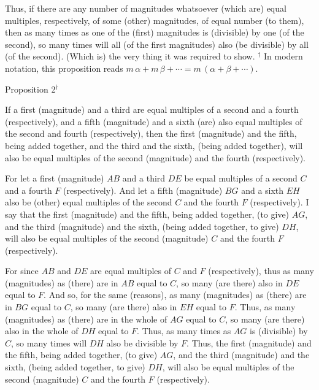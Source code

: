 Thus, if there are any number of magnitudes whatsoever (which are) equal multiples, respectively, of
some (other) magnitudes,  of  equal  number (to them), then as many times as one of the (first) magnitudes is (divisible) by one (of the second), so many times
will all (of the first magnitudes) also (be divisible) by all (of the second). (Which is)
the very thing it was required to show.
{\footnotesize \noindent$^\dag$ In modern notation, this proposition
reads $m\,\alpha + m\,\beta +\cdots= m\,(\alpha+\beta+\cdots)$.}


\begin{center}
{\large Proposition 2}$^{\dag}$
\end{center}

If a first (magnitude) and a third are equal multiples of a second
and a fourth (respectively), and a fifth (magnitude) and a sixth (are) also equal multiples of the
second and fourth (respectively), then the first (magnitude) and the fifth, being added together, and the third and the sixth,  (being added together), will also be equal multiples of the
second (magnitude) and the fourth (respectively).

For let a first (magnitude) $AB$ and a third $DE$ be equal multiples of a
second $C$ and a fourth $F$ (respectively). And let a fifth (magnitude) $BG$
and a sixth $EH$ also be (other) equal multiples of the second $C$ and the fourth $F$
(respectively). I say that the first (magnitude) and the fifth, being added together, (to give) $AG$,
and the third (magnitude) and the sixth, (being added together, to give) $DH$, will also be
equal multiples of the second (magnitude) $C$ and the fourth $F$ (respectively).

\epsfysize=1.5in
\centerline{}

For since $AB$ and $DE$ are equal multiples of $C$ and $F$ (respectively), 
thus as many (magnitudes) as (there) are in $AB$ equal to $C$, so many (are there) also
in $DE$ equal to $F$.  And so, for the same (reasons),   as many (magnitudes) as (there) are in $BG$ equal to $C$, so many (are there) also in $EH$ equal to $F$.
Thus, as many (magnitudes) as (there) are in the whole of $AG$ equal to $C$,
so many (are there) also in the whole of $DH$ equal to $F$.
Thus, as many times as $AG$ is (divisible) by $C$, so many times will $DH$ also
be divisible by $F$. Thus, the first (magnitude) and the fifth, being
added together, (to give) $AG$, and the third (magnitude) and the sixth, (being
added together, to give) $DH$, will also be equal multiples of the second (magnitude)
$C$ and the fourth $F$ (respectively).

